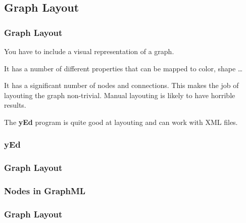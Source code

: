 {\subsection{Graph Layout}
\begin{frame}[fragile]
  \frametitle{Graph Layout}
  \pause
  \vspace{3mm}
  You have to include a visual representation of a graph.
  
  \vspace{5mm}
  It has a number of different properties that can be mapped to color, shape \ldots
  
  \vspace{5mm}
  It has a significant number of nodes and connections. This makes the job of layouting the graph non-trivial. Manual layouting is likely to have horrible results.
  
  \pause
  \vspace{5mm}
  The \textbf{yEd} program is quite good at layouting and can work with XML files.
\end{frame}

\subsubsection{yEd}
\begin{frame}[fragile]
  \frametitle{Graph Layout }
  
\end{frame}

\subsubsection{Nodes in GraphML}
\begin{frame}[fragile]
  \frametitle{Graph Layout }
  \vspace{-2mm}
  

\end{frame}}
